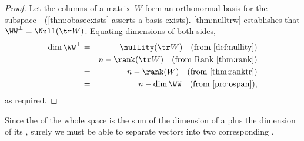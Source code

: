 \begin{reduce}
\begin{proof} 
Let the columns of a matrix~\(W\) form an orthonormal basis for the subspace~\WW\ (\cref{thm:obaseexists} asserts a basis exists).
\cref{thm:nulltrw} establishes that \(\WW^\perp=\Null(\tr W)\).
Equating dimensions of both sides, 
\begin{eqnarray*}
\dim\WW^\perp&=&\nullity(\tr W) 
\quad(\text{from \cref{def:nullity}})
\\&=&n-\rank(\tr W)
\quad(\text{from Rank \cref{thm:rank}})
\\&=&n-\rank(W)
\quad(\text{from \cref{thm:ranktr}})
\\&=&n-\dim\WW
\quad(\text{from \cref{pro:ospan}}),
\end{eqnarray*}
as required.
\end{proof}


Since the  of the whole space is the sum of the dimension of a  plus the dimension of its , surely we must be able to separate vectors into two corresponding .


\end{reduce}
